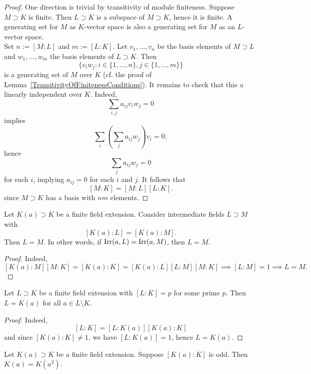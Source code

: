     \begin{proof}
        One direction is trivial by transitivity of module finiteness. Suppose $M\supset K$ is finite. Then $L\supset K$ is a subspace of $M\supset K$, hence it is finite. A generating set for $M$ as $K$-vector space is also a generating set for $M$ as an $L$-vector space.\\
        Set $n:= [M : L]$ and $m := [L : K]$. Let $v_1,\dots,v_n$ be the basis elements of $M\supset L$ and $w_1,\dots,w_m$ the basis elements of $L\supset K$. Then 
        $$
            \{v_iw_j : i\in \{1,\dots,n\} , j\in \{1,\dots,m\}\}
        $$
        is a generating set of $M$ over $K$ (cf. the proof of Lemma~\ref{TransitivityOfFinitenessConditions}). It remains to check that this a linearly independent over $K$. Indeed,
        $$
            \sum_{i,j} a_{ij} v_iw_j = 0
        $$
        implies 
        $$
            \sum_{i} \left( \sum_j a_{ij} w_j\right)v_i = 0,
        $$
        hence 
        $$
            \sum_{j} a_{ij} w_j = 0
        $$
        for each $i$, implying $a_{ij} =0 $ for each $i$ and $j$.
        It follows that 
        $$
            [M : K] = [M : L][L : K].
        $$
        since $M \supset K$ has a basis with $nm$ elements.  
    \end{proof}
    \begin{corollary}
        Let $K(a) \supset K$ be a finite field extension. Consider intermediate fields $L\supset M$ with
        $$
            [K(a):L]=[K(a):M].
        $$
        Then $L=M$. In other words, if $\mathrm{Irr}(a,L)=\mathrm{Irr}(a,M)$, then $L=M$. 
    \end{corollary}
    \begin{proof}
        Indeed, 
        $$
            [K(a):M][M:K] = [K(a):K]=[K(a):L][L:M][M:K] \implies [L:M] = 1 \implies L=M.
        $$
    \end{proof}
    \begin{proposition}
        Let $L\supset K$ be a finite field extension with $[L:K]=p$ for some prime $p$. Then $L=K(a)$ for all $a\in L\setminus K$. 
    \end{proposition}
    \begin{proof}
        Indeed, 
        $$
            [L : K] = [L : K(a)][K(a) : K]
        $$
        and since $[K(a):K]\neq 1$, we have $[L : K(a)] = 1$, hence $L = K(a)$. 
    \end{proof}
    \begin{proposition}
        Let $K(a)\supset K$ be a finite field extension. Suppose $[K(a) : K]$ is odd. Then $K(a) = K(a^2)$. 
    \end{proposition}
